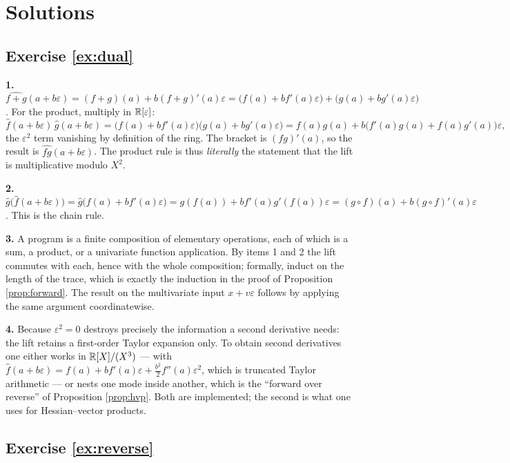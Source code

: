 \documentclass[11pt,a4paper]{article}
\begin{document}

\ifsolutions
\newpage
\section{Solutions}

\subsection*{Exercise \ref{ex:dual}}

\textbf{1.} $\widehat{f+g}(a+b\varepsilon) = (f+g)(a) + b(f+g)'(a)\varepsilon
= \big(f(a) + bf'(a)\varepsilon\big) + \big(g(a)+bg'(a)\varepsilon\big)$. For the product, multiply
in $\mathbb{R}[\varepsilon]$:
\[
\widehat f(a+b\varepsilon)\,\widehat g(a+b\varepsilon)
= \big(f(a)+bf'(a)\varepsilon\big)\big(g(a)+bg'(a)\varepsilon\big)
= f(a)g(a) + b\big(f'(a)g(a) + f(a)g'(a)\big)\varepsilon,
\]
the $\varepsilon^2$ term vanishing by definition of the ring. The bracket is $(fg)'(a)$, so the
result is $\widehat{fg}(a+b\varepsilon)$. The product rule is thus \emph{literally} the statement
that the lift is multiplicative modulo $X^2$.

\textbf{2.} $\widehat g\big(\widehat f(a+b\varepsilon)\big) = \widehat g\big(f(a) + bf'(a)\varepsilon\big)
= g(f(a)) + bf'(a)g'(f(a))\varepsilon = (g\circ f)(a) + b(g\circ f)'(a)\varepsilon$. This is the
chain rule.

\textbf{3.} A program is a finite composition of elementary operations, each of which is a sum, a
product, or a univariate function application. By items 1 and 2 the lift commutes with each, hence
with the whole composition; formally, induct on the length of the trace, which is exactly the
induction in the proof of Proposition \ref{prop:forward}. The result on the multivariate input
$x + v\varepsilon$ follows by applying the same argument coordinatewise.

\textbf{4.} Because $\varepsilon^2 = 0$ destroys precisely the information a second derivative
needs: the lift retains a first-order Taylor expansion only. To obtain second derivatives one either
works in $\mathbb{R}[X]/(X^3)$ --- with $\widehat f(a+b\varepsilon) = f(a) + bf'(a)\varepsilon +
\tfrac{b^2}{2}f''(a)\varepsilon^2$, which is truncated Taylor arithmetic --- or nests one mode
inside another, which is the ``forward over reverse'' of Proposition \ref{prop:hvp}. Both are
implemented; the second is what one uses for Hessian--vector products.

\subsection*{Exercise \ref{ex:reverse}}
\end{document}
